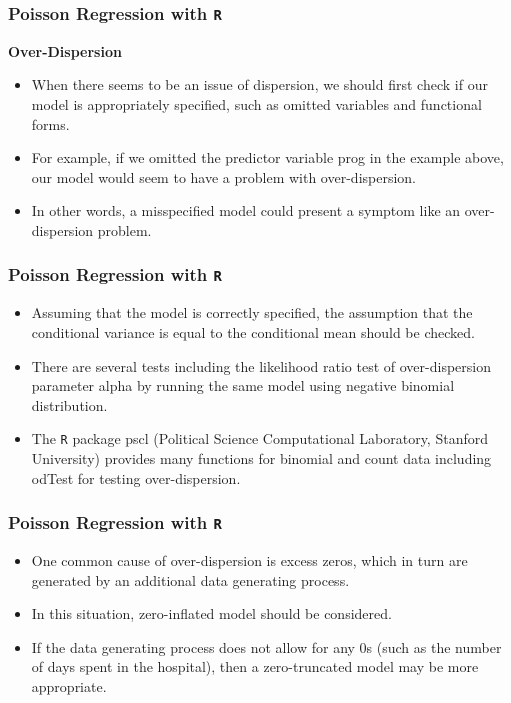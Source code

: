 


\begin{frame}[fragile]

\frametitle{Poisson Regression with \texttt{R}}
\Large
\textbf{Over-Dispersion}
\begin{itemize}

 \item When there seems to be an issue of dispersion, we should first check if our model is appropriately specified, 
 such as omitted variables and functional forms. 
 \item For example, if we omitted the predictor variable prog in the example above, our model would seem to have a 
 problem with over-dispersion. 
 \item In other words, a misspecified model could present a symptom like an over-dispersion problem. 
\end{itemize}
\end{frame}
\begin{frame}[fragile]
\frametitle{Poisson Regression with \texttt{R}}
	\Large
\begin{itemize}
\item Assuming that the model is correctly specified, the assumption that the conditional variance is equal 
to the conditional mean should be checked. 
\item There are several tests including the likelihood ratio test of over-dispersion parameter alpha by running the 
same model using negative binomial distribution. 
\item The \texttt{R} package pscl (Political Science Computational Laboratory, Stanford University) provides many functions for binomial 
and count data including odTest for testing over-dispersion. 
\end{itemize}
\end{frame}
\begin{frame}[fragile]
	\frametitle{Poisson Regression with \texttt{R}}
	\Large
	\begin{itemize}
\item One common cause of over-dispersion is excess zeros, which in turn are generated by an additional data generating 
process. 
\item In this situation, zero-inflated model should be considered.
\item If the data generating process does not allow for any 0s (such as the number of days spent in the hospital), then a zero-truncated model may be more appropriate.
\end{itemize}
\end{frame}
